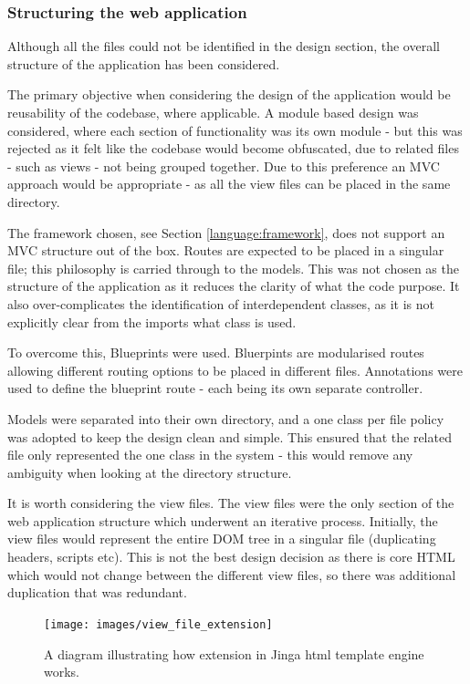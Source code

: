 \subsubsection{Structuring the web application}
Although all the files could not be identified in the design section, the overall structure of the application has been considered.

The primary objective when considering the design of the application would be reusability of the codebase, where applicable. A module based design was considered, where each section of functionality was its own module - but this was rejected as it felt like the codebase would become obfuscated, due to related files - such as views - not being grouped together. Due to this preference an MVC approach would be appropriate - as all the view files can be placed in the same directory.

The framework chosen, see Section \ref{language:framework}, does not support an MVC structure out of the box. Routes are expected to be placed in a singular file; this philosophy is carried through to the models. This was not chosen as the structure of the application as it reduces the clarity of what the code purpose. It also over-complicates the identification of interdependent classes, as it is not explicitly clear from the imports what class is used.

To overcome this, Blueprints \cite{citeulike:13983911} were used. Bluerpints are modularised routes allowing different routing options to be placed in different files. Annotations were used to define the blueprint route - each being its own separate controller.

Models were separated into their own directory, and a one class per file policy was adopted to keep the design clean and simple. This ensured that the related file only represented the one class in the system - this would remove any ambiguity when looking at the directory structure.

It is worth considering the view files. The view files were the only section of the web application structure which underwent an iterative process. Initially, the view files would represent the entire DOM tree in a singular file (duplicating headers, scripts etc). This is not the best design decision as there is core HTML which would not change between the different view files, so there was additional duplication that was redundant.

\begin{figure}[H]
  \centering
  \texttt{[image: images/view\_file\_extension]}
  \caption{A diagram illustrating how extension in Jinga html template engine works.}
  \label{fig:extension}
\end{figure}


